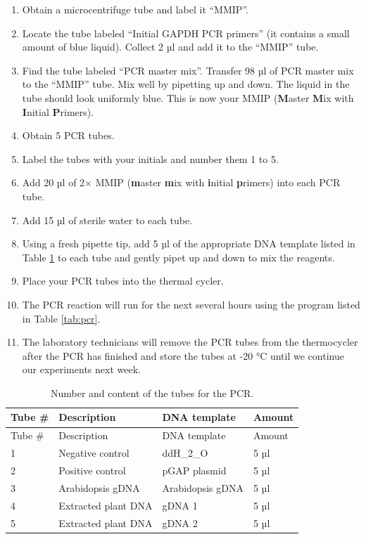 \documentclass[]{book}
\providecommand{\tightlist}{%
  \setlength{\itemsep}{0pt}\setlength{\parskip}{0pt}}
\begin{document}
\begin{enumerate}
\def\labelenumi{\arabic{enumi}.}
\tightlist
\item
  Obtain a microcentrifuge tube and label it ``MMIP''.
\item
  Locate the tube labeled ``Initial GAPDH PCR primers'' (it contains a small amount of blue liquid). Collect 2 µl and add it to the ``MMIP'' tube.
\item
  Find the tube labeled ``PCR master mix''. Transfer 98 µl of PCR master mix to the ``MMIP'' tube. Mix well by pipetting up and down. The liquid in the tube should look uniformly blue. This is now your MMIP (\textbf{M}aster \textbf{M}ix with \textbf{I}nitial \textbf{P}rimers).
\item
  Obtain 5 PCR tubes.
\item
  Label the tubes with your initials and number them 1 to 5.
\item
  Add 20 µl of 2× MMIP (\textbf{m}aster \textbf{m}ix with \textbf{i}nitial \textbf{p}rimers) into each PCR tube.
\item
  Add 15 µl of sterile water to each tube.
\item
  Using a fresh pipette tip, add 5 µl of the appropriate DNA template listed in Table \ref{tab:tubes} to each tube and gently pipet up and down to mix the reagents.
\item
  Place your PCR tubes into the thermal cycler.
\item
  The PCR reaction will run for the next several hours using the program listed in Table \ref{tab:pcr}.
\item
  The laboratory technicians will remove the PCR tubes from the thermocycler after the PCR has finished and store the tubes at -20 °C until we continue our experiments next week.
\end{enumerate}

\begin{longtable}[]{@{}llll@{}}
\caption{\label{tab:tubes} Number and content of the tubes for the PCR.}\tabularnewline
\toprule
Tube \# & Description & DNA template & Amount\tabularnewline
\midrule
\endfirsthead
\toprule
Tube \# & Description & DNA template & Amount\tabularnewline
\midrule
\endhead
1 & Negative control & ddH\_2\_O & 5 µl\tabularnewline
2 & Positive control & pGAP plasmid & 5 µl\tabularnewline
3 & Arabidopsis gDNA & Arabidopsis gDNA & 5 µl\tabularnewline
4 & Extracted plant DNA & gDNA 1 & 5 µl\tabularnewline
5 & Extracted plant DNA & gDNA 2 & 5 µl\tabularnewline
\bottomrule
\end{longtable}
\end{document}
